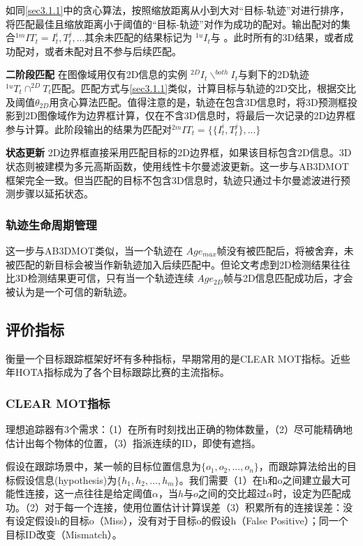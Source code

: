 如同\ref{sec3.1.1}中的贪心算法，按照缩放距离从小到大对“目标-轨迹”对进行排序，将匹配最佳且缩放距离小于阈值的“目标-轨迹”对作为成功的配对。输出配对的集合$^{1m}IT_t={{I_t^i,T_t^j},...}$其余未匹配的结果标记为 $^{1u}I_t$与 。此时所有的3D结果，或者成功配对，或者未配对且不参与后续匹配。

\textbf{二阶段匹配} 在图像域用仅有2D信息的实例 $^{2D}I_t\backslash^{both}I_t$与剩下的2D轨迹 $^{1u}T_t\cap^{2D}T_t$匹配。匹配方式与\ref{sec3.1.1}类似，计算目标与轨迹的2D交比，根据交比及阈值$\theta_{2D}$用贪心算法匹配。值得注意的是，轨迹在包含3D信息时，将3D预测框投影到2D图像域作为边界框计算，仅在不含3D信息时，将最后一次记录的2D边界框参与计算。此阶段输出的结果为匹配对$^{2m}IT_t=\{\{I_t^i,T_t^j\},...\}$

\textbf{状态更新} 2D边界框直接采用匹配目标的2D边界框，如果该目标包含2D信息。3D状态则被建模为多元高斯函数，使用线性卡尔曼滤波更新。这一步与AB3DMOT框架\cite{weng20203d}完全一致。但当匹配的目标不包含3D信息时，轨迹只通过卡尔曼滤波进行预测步骤以延拓状态。

\subsubsection{轨迹生命周期管理}

这一步与AB3DMOT类似，当一个轨迹在 $Age_{max}$帧没有被匹配后，将被舍弃，未被匹配的新目标会被当作新轨迹加入后续匹配中。但论文考虑到2D检测结果往往比3D检测结果更可信，只有当一个轨迹连续 $Age_{2D}$帧与2D信息匹配成功后，才会被认为是一个可信的新轨迹。

\subsection{评价指标}

衡量一个目标跟踪框架好坏有多种指标，早期常用的是CLEAR MOT\cite{bernardin2008evaluating}指标。近些年HOTA\cite{luiten2021hota}指标成为了各个目标跟踪比赛的主流指标。

\subsubsection{CLEAR MOT指标}

理想追踪器有3个需求：（1）在所有时刻找出正确的物体数量，（2）尽可能精确地估计出每个物体的位置，（3）指派连续的ID，即使有遮挡。

假设在跟踪场景中，某一帧的目标位置信息为$\{o_1,o_2,...,o_n\}$，而跟踪算法给出的目标假设信息(hypothesis)为$\{h_1,h_2,...,h_m\}$。我们需要（1）在h和o之间建立最大可能性连接，这一点往往是给定阈值$\alpha$，当$h$与$o$之间的交比超过$\alpha$时，设定为匹配成功。（2）对于每一个连接，使用位置估计计算误差（3）积累所有的连接误差：没有设定假设h的目标o（Miss），没有对于目标o的假设h（False Positive）；同一个目标ID改变（Mismatch）。

